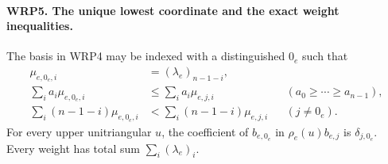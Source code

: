 \documentclass[11pt,a4paper]{article}
\numberwithin{equation}{section}
\theoremstyle{remark}\newtheorem{remark}[theorem]{Remark}
\begin{document}
\paragraph{WRP5. The unique lowest coordinate and the exact weight inequalities.}
\label{claim:WRP5}
The basis in WRP4 may be indexed with a distinguished $0_e$
such that
\begin{align}
 \mu_{e,0_e,\allowbreak{} i}&=(\lambda_e)_{n-1-i},\\
 \sum_i a_i\mu_{e,0_e,\allowbreak{} i}&\leq\sum_i a_i\mu_{e,\allowbreak{} j,\allowbreak{} i}
                         &&(a_0\geq\cdots\geq a_{n-1}),\\
 \sum_i(n-1-i)\mu_{e,0_e,\allowbreak{} i}
                 &<\sum_i(n-1-i)\mu_{e,\allowbreak{} j,\allowbreak{} i} &&(j\ne0_e).
 \label{eq:wrp-weights}
\end{align}
For every upper unitriangular $u$, the coefficient of
$b_{e,0_e}$ in $\rho_e(u)b_{e,\allowbreak{} j}$ is $\delta_{j,0_e}$.
Every weight has total sum $\sum_i(\lambda_e)_i$.
\end{document}
